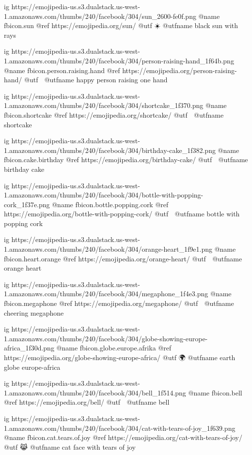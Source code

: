   ig https://emojipedia-us.s3.dualstack.us-west-1.amazonaws.com/thumbs/240/facebook/304/sun_2600-fe0f.png
  @name fbicon.sun
  @ref https://emojipedia.org/sun/
  @utf ☀️
  @utfname black sun with rays

  ig https://emojipedia-us.s3.dualstack.us-west-1.amazonaws.com/thumbs/240/facebook/304/person-raising-hand_1f64b.png
  @name fbicon.person.raising.hand
  @ref https://emojipedia.org/person-raising-hand/
  @utf 🙋
  @utfname happy person raising one hand

  ig https://emojipedia-us.s3.dualstack.us-west-1.amazonaws.com/thumbs/240/facebook/304/shortcake_1f370.png
  @name fbicon.shortcake
  @ref https://emojipedia.org/shortcake/
  @utf 🍰
  @utfname shortcake

  ig https://emojipedia-us.s3.dualstack.us-west-1.amazonaws.com/thumbs/240/facebook/304/birthday-cake_1f382.png
  @name fbicon.cake.birthday
  @ref https://emojipedia.org/birthday-cake/
  @utf 🎂
  @utfname birthday cake

  ig https://emojipedia-us.s3.dualstack.us-west-1.amazonaws.com/thumbs/240/facebook/304/bottle-with-popping-cork_1f37e.png
  @name fbicon.bottle.popping.cork
  @ref https://emojipedia.org/bottle-with-popping-cork/
  @utf 🍾
  @utfname bottle with popping cork

  ig https://emojipedia-us.s3.dualstack.us-west-1.amazonaws.com/thumbs/240/facebook/304/orange-heart_1f9e1.png
  @name fbicon.heart.orange
  @ref https://emojipedia.org/orange-heart/
  @utf 🧡
  @utfname orange heart

  ig https://emojipedia-us.s3.dualstack.us-west-1.amazonaws.com/thumbs/240/facebook/304/megaphone_1f4e3.png
  @name fbicon.megaphone
  @ref https://emojipedia.org/megaphone/
  @utf 📣
  @utfname cheering megaphone

  ig https://emojipedia-us.s3.dualstack.us-west-1.amazonaws.com/thumbs/240/facebook/304/globe-showing-europe-africa_1f30d.png
  @name fbicon.globe.europe.afrika
  @ref https://emojipedia.org/globe-showing-europe-africa/
  @utf 🌍
  @utfname earth globe europe-africa

  ig https://emojipedia-us.s3.dualstack.us-west-1.amazonaws.com/thumbs/240/facebook/304/bell_1f514.png
  @name fbicon.bell
  @ref https://emojipedia.org/bell/
  @utf 🔔
  @utfname bell

  ig https://emojipedia-us.s3.dualstack.us-west-1.amazonaws.com/thumbs/240/facebook/304/cat-with-tears-of-joy_1f639.png
  @name fbicon.cat.tears.of.joy
  @ref https://emojipedia.org/cat-with-tears-of-joy/
  @utf 😹
  @utfname cat face with tears of joy

